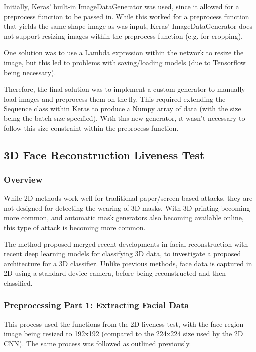 \documentclass[10pt,a4paper]{article}
\begin{document}
                Initially, Keras' built-in ImageDataGenerator was used, since it allowed for a preprocess function to be passed in. While this worked for a preprocess function that yields the same shape image
                as was input, Keras' ImageDataGenerator does not support resizing images within the preprocess function (e.g. for cropping).

                One solution was to use a Lambda expression within the network to resize the image, but this led to problems with saving/loading models (due to Tensorflow being necessary).

                Therefore, the final solution was to implement a custom generator to manually load images and preprocess them on the fly. This required extending the Sequence class within Keras to produce a Numpy array of data (with the size being the batch size specified). With this new generator, it wasn't necessary to follow this size constraint within the preprocess function. 


    \subsection{3D Face Reconstruction Liveness Test}
        \subsubsection{Overview}
        While 2D methods work well for traditional paper/screen based attacks, they are not designed for detecting the wearing of 3D masks. With 3D printing
        becoming more common, and automatic mask generators also becoming available online, this type of attack is becoming more common.

        The method proposed merged recent developments in facial reconstruction with recent deep learning models for classifying 3D data, to investigate a proposed architecture for a 3D classifier. Unlike previous methods, face data is captured in 2D using a standard device camera, before being reconstructed and then classified.

        \subsubsection{Preprocessing Part 1: Extracting Facial Data}
            This process used the functions from the 2D liveness test, with the face region image being resized to 192x192 (compared to the 224x224 size used by the 2D CNN).
            The same process was followed as outlined previously.
\end{document}
